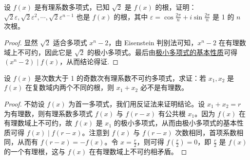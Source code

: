 \documentclass[../../main.tex]{subfiles}%
\begin{document}
\begin{example}
设 $f(x)$ 是有理系数多项式，已知 $\sqrt{2}$ 是 $f(x)$ 的根，证明：$\sqrt{2} \varepsilon, \sqrt{2} \varepsilon^2, \cdots, \sqrt{2} \varepsilon^{n-1}$ 也是 $f(x)$ 的根，其中 $\varepsilon = \cos \frac{2\pi}{n} + i \sin \frac{2\pi}{n}$ 是 1 的 $n$ 次根。  
\end{example}
\begin{proof}
显然 $\sqrt{2}$ 适合多项式 $x^n - 2$，由 Eisenstein 判别法可知，$x^n - 2$ 在有理数域上不可约，因此它是 $\sqrt{2}$ 的极小多项式。最后由\hyperref[proposition:极小多项式的基本性质]{极小多项式的基本性质}可得 $(x^n - 2) \mid f(x)$，从而结论得证.
\end{proof}

\begin{example}
设 $f(x)$ 是次数大于 1 的奇数次有理系数不可约多项式，求证：若 $x_1, x_2$ 是 $f(x)$ 在复数域内两个不同的根，则 $x_1 + x_2$ 必不是有理数。
\end{example}
\begin{proof}
不妨设 $f(x)$ 为首一多项式，我们用反证法来证明结论。设 $x_1 + x_2 = r$ 为有理数，则有理系数多项式 $f(x)$ 与 $f(r - x)$ 有公共根 $x_1$。因为 $f(x)$ 在有理数域上不可约，故 $f(x)$ 是 $x_1$ 的极小多项式，从而由极小多项式的基本性质可得 $f(x) \mid f(r - x)$。注意到 $f(x)$ 与 $f(r - x)$ 次数相同，首项系数相同，从而有 $f(r - x) = -f(x)$。令 $x = \frac{r}{2}$，则可得 $f\left(\frac{r}{2}\right) = 0$，即 $\frac{r}{2}$ 是 $f(x)$ 的一个有理根，这与 $f(x)$ 在有理数域上不可约相矛盾。
\end{proof}
\end{document}
